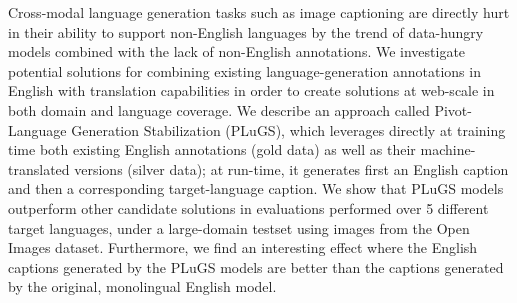 Cross-modal language generation tasks such as image captioning are directly hurt in their ability to support non-English languages by the trend of data-hungry models combined with the lack of non-English annotations. We investigate potential solutions for combining existing language-generation annotations in English with translation capabilities in order to create solutions at web-scale in both domain and language coverage. We describe an approach called Pivot-Language Generation Stabilization (PLuGS), which leverages directly at training time both existing English annotations (gold data) as well as their machine-translated versions (silver data); at run-time, it generates first an English caption and then a corresponding target-language caption. We show that PLuGS models outperform other candidate solutions in evaluations performed over 5 different target languages, under a large-domain testset using images from the Open Images dataset. Furthermore, we find an interesting effect where the English captions generated by the PLuGS models are better than the captions generated by the original, monolingual English model.
